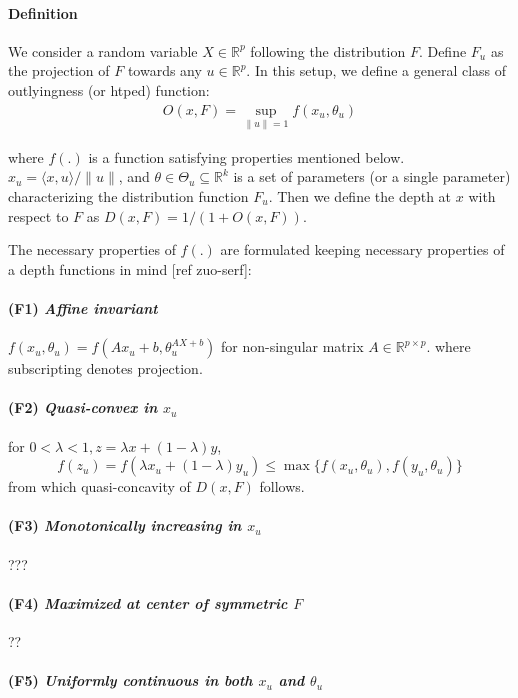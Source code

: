 \documentclass{article}
\begin{document}
\paragraph{Definition}
We consider a random variable $X\in\mathbb{R}^p$ following the distribution $F$. Define $F_u$ as the projection of $F$ towards any $u\in\mathbb{R}^p$. In this setup, we define a general class of outlyingness (or htped) function:
\begin{eqnarray}
O(x,F) = \sup_{\|u\|=1} f(x_u,\theta_u)
\end{eqnarray}

where $f(.)$ is a function satisfying properties mentioned below. $x_u=\langle x,u\rangle/\|u\| $, and $\theta\in\Theta_u \subseteq \mathbb{R}^k$ is a set of parameters (or a single parameter) characterizing the distribution function $F_u$. Then we define the depth at $x$ with respect to $F$ as $ D(x,F) = 1/(1+O(x,F)) $.

The necessary properties of $f(.)$ are formulated keeping necessary properties of a depth functions in mind [ref zuo-serf]:
\paragraph{(F1) \textit{Affine invariant}} $f(x_u,\theta_u) = f(Ax_u+b,\theta^{AX+b}_u)$ for non-singular matrix $A\in\mathbb{R}^{p\times p}$.
where subscripting denotes projection.

\paragraph{(F2) \textit{Quasi-convex in $x_u$}} for $0<\lambda<1, z=\lambda x+(1-\lambda)y$,
$$ f(z_u) = f(\lambda x_u+(1-\lambda)y_u) \leq \max\lbrace f(x_u,\theta_u), f(y_u,\theta_u)\rbrace$$
from which quasi-concavity of $D(x,F)$ follows.

\paragraph{(F3) \textit{Monotonically increasing in $x_u$}} ???

\paragraph{(F4) \textit{Maximized at center of symmetric $F$}} ??

\paragraph{(F5) \textit{Uniformly continuous in both $x_u$ and $\theta_u$}}
\end{document}
